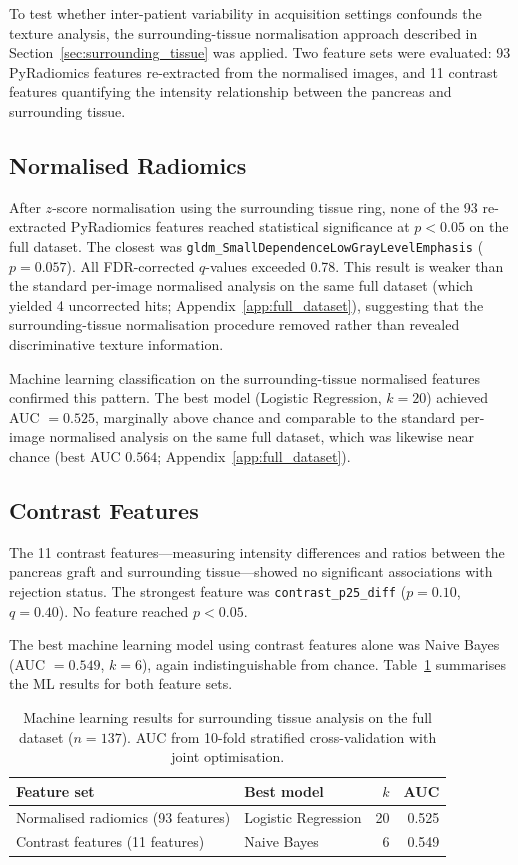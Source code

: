 To test whether inter-patient variability in acquisition settings confounds the texture analysis, the surrounding-tissue normalisation approach described in Section~\ref{sec:surrounding_tissue} was applied. Two feature sets were evaluated: 93 PyRadiomics features re-extracted from the normalised images, and 11 contrast features quantifying the intensity relationship between the pancreas and surrounding tissue.

\subsection{Normalised Radiomics}

After $z$-score normalisation using the surrounding tissue ring, none of the 93 re-extracted PyRadiomics features reached statistical significance at $p < 0.05$ on the full dataset. The closest was \texttt{gldm\_SmallDependenceLowGrayLevelEmphasis} ($p = 0.057$). All FDR-corrected $q$-values exceeded 0.78. This result is weaker than the standard per-image normalised analysis on the same full dataset (which yielded 4 uncorrected hits; Appendix~\ref{app:full_dataset}), suggesting that the surrounding-tissue normalisation procedure removed rather than revealed discriminative texture information.

Machine learning classification on the surrounding-tissue normalised features confirmed this pattern. The best model (Logistic Regression, $k = 20$) achieved AUC $= 0.525$, marginally above chance and comparable to the standard per-image normalised analysis on the same full dataset, which was likewise near chance (best AUC $0.564$; Appendix~\ref{app:full_dataset}).

\subsection{Contrast Features}

The 11 contrast features---measuring intensity differences and ratios between the pancreas graft and surrounding tissue---showed no significant associations with rejection status. The strongest feature was \texttt{contrast\_p25\_diff} ($p = 0.10$, $q = 0.40$). No feature reached $p < 0.05$.

The best machine learning model using contrast features alone was Naive Bayes (AUC $= 0.549$, $k = 6$), again indistinguishable from chance. Table~\ref{tab:surrounding_ml} summarises the ML results for both feature sets.

\begin{table}[ht]
\centering
\caption{Machine learning results for surrounding tissue analysis on the full dataset ($n = 137$). AUC from 10-fold stratified cross-validation with joint optimisation.}
\label{tab:surrounding_ml}
\begin{tabular}{llrr}
\toprule
Feature set & Best model & $k$ & AUC \\
\midrule
Normalised radiomics (93 features) & Logistic Regression & 20 & 0.525 \\
Contrast features (11 features) & Naive Bayes & 6 & 0.549 \\
\bottomrule
\end{tabular}
\end{table}

